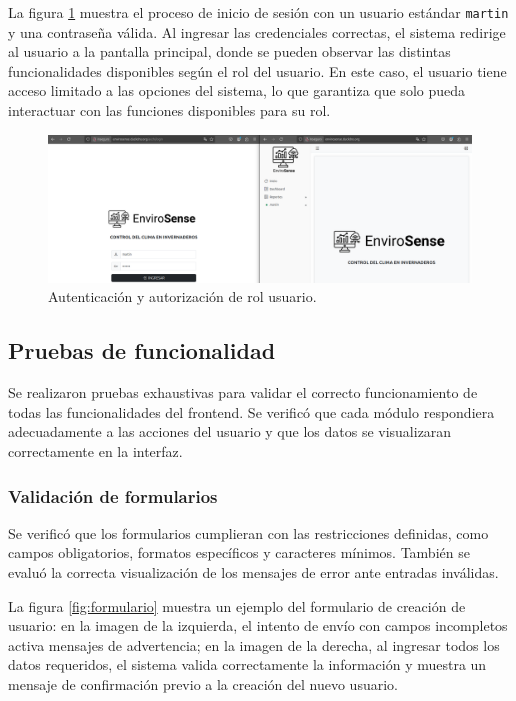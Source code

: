 La figura \ref{fig:login_correcto_user} muestra el proceso de inicio de sesión
con un usuario estándar \texttt{martin} y una contraseña válida. Al ingresar
las credenciales correctas, el sistema redirige al usuario a la pantalla
principal, donde se pueden observar las distintas funcionalidades disponibles
según el rol del usuario. En este caso, el usuario tiene acceso limitado a las
opciones del sistema, lo que garantiza que solo pueda interactuar con las
funciones disponibles para su rol.

\begin{figure}[H]
    \centering
    \includegraphics[width=\textwidth]{Images/43_login_correcto_user.png}
    \caption[Autenticación y autorización rol usuario]{Autenticación y autorización de rol usuario.}
    \label{fig:login_correcto_user}
\end{figure}

\subsection{Pruebas de funcionalidad}

Se realizaron pruebas exhaustivas para validar el correcto funcionamiento de
todas las funcionalidades del frontend. Se verificó que cada módulo respondiera
adecuadamente a las acciones del usuario y que los datos se visualizaran
correctamente en la interfaz.

\subsubsection{Validación de formularios}

Se verificó que los formularios cumplieran con las restricciones definidas,
como campos obligatorios, formatos específicos y caracteres mínimos. También se
evaluó la correcta visualización de los mensajes de error ante entradas
inválidas.

La figura \ref{fig:formulario} muestra un ejemplo del formulario de creación de
usuario: en la imagen de la izquierda, el intento de envío con campos
incompletos activa mensajes de advertencia; en la imagen de la derecha, al
ingresar todos los datos requeridos, el sistema valida correctamente la
información y muestra un mensaje de confirmación previo a la creación del nuevo
usuario.

